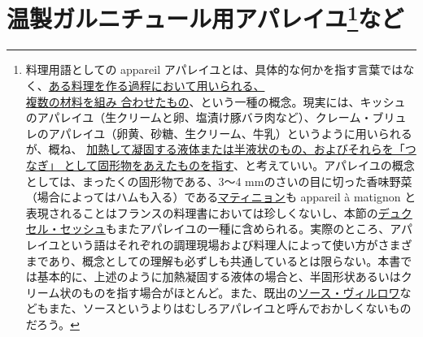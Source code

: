 \hypertarget{serie-des-appareiles-et-preparations-diverses-pour-garnitures-chaudes}{%
\section[温製ガルニチュール用アパレイユなど]{\texorpdfstring{温製ガルニチュール用アパレイユ\footnote{料理用語としての
  appareil
  アパレイユとは、具体的な何かを指す言葉ではなく、\ul{ある料理を作る過程において用いられる、\\複数の材料を組み
  合わせたもの}、という一種の概念。現実には、キッシュのアパレイユ（生クリームと卵、塩漬け豚バラ肉など）、クレーム・ブリュレのアパレイユ（卵黄、砂糖、生クリーム、牛乳）というように用いられるが、概ね、
  \ul{加熱して凝固する液体または半液状のもの、およびそれらを「つなぎ」
  として固形物をあえたものを指す}、と考えていい。アパレイユの概念としては、まったくの固形物である、3〜4
  mmのさいの目に切った香味野菜（場合によってはハムも入る）である\protect\hyperlink{matignon}{マティニョン}も
  appareil à matignon
  と表現されることはフランスの料理書においては珍しくないし、本節の\protect\hyperlink{duxelles-seche}{デュクセル・セッシュ}もまたアパレイユの一種に含められる。実際のところ、アパレイユという語はそれぞれの調理現場および料理人によって使い方がさまざまであり、概念としての理解も必ずしも共通しているとは限らない。本書では基本的に、上述のように加熱凝固する液体の場合と、半固形状あるいはクリーム状のものを指す場合がほとんど。また、既出の\protect\hyperlink{sauce-villeroy}{ソース・ヴィルロワ}などもまた、ソースというよりはむしろアパレイユと呼んでおかしくないものだろう。}など}{温製ガルニチュール用アパレイユなど}}\label{serie-des-appareiles-et-preparations-diverses-pour-garnitures-chaudes}}


